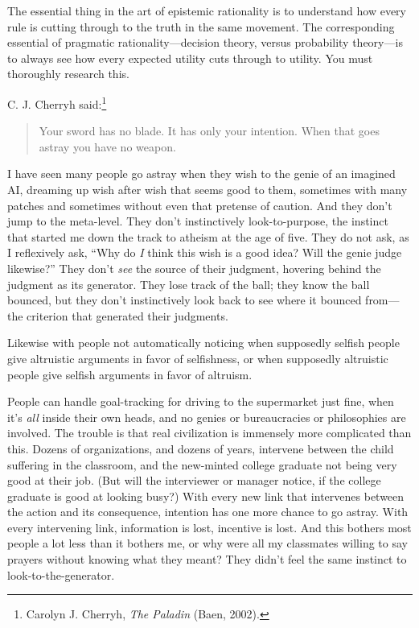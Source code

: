 {{{
 The essential thing in the art of epistemic rationality is to
understand how every rule is cutting through to the truth in the same
movement. The corresponding essential of pragmatic
rationality---decision theory, versus probability theory---is to always
see how every expected utility cuts through to utility. You must
thoroughly research this.}

{
 C. J. Cherryh said:\footnote{Carolyn J. Cherryh, \textit{The Paladin} (Baen, 2002).}}

\begin{quote}
{
 Your sword has no blade. It has only your intention. When that
 goes astray you have no weapon.}
\end{quote}

{
 I have seen many people go astray when they wish to the genie of
an imagined AI, dreaming up wish after wish that seems good to them,
sometimes with many patches and sometimes without even that pretense of
caution. And they don't jump to the meta-level. They
don't instinctively look-to-purpose, the instinct that
started me down the track to atheism at the age of five. They do not
ask, as I reflexively ask, ``Why do \textit{I} think
this wish is a good idea? Will the genie judge
likewise?'' They don't \textit{see}
the source of their judgment, hovering behind the judgment as its
generator. They lose track of the ball; they know the ball bounced, but
they don't instinctively look back to see where it
bounced from---the criterion that generated their judgments.}

{
 Likewise with people not automatically noticing when supposedly
selfish people give altruistic arguments in favor of selfishness, or
when supposedly altruistic people give selfish arguments in favor of
altruism.}

{
 People can handle goal-tracking for driving to the supermarket
just fine, when it's \textit{all} inside their own
heads, and no genies or bureaucracies or philosophies are involved. The
trouble is that real civilization is immensely more complicated than
this. Dozens of organizations, and dozens of years, intervene between
the child suffering in the classroom, and the new-minted college
graduate not being very good at their job. (But will the interviewer or
manager notice, if the college graduate is good at looking busy?) With
every new link that intervenes between the action and its consequence,
intention has one more chance to go astray. With every intervening
link, information is lost, incentive is lost. And this bothers most
people a lot less than it bothers me, or why were all my classmates
willing to say prayers without knowing what they meant? They
didn't feel the same instinct to
look-to-the-generator.}

}}
